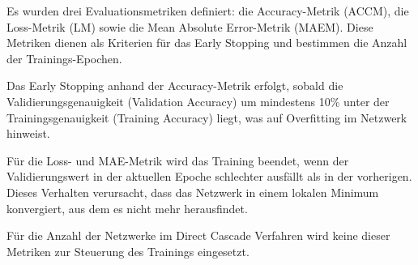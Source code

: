 Es wurden drei Evaluationsmetriken definiert: die Accuracy-Metrik (ACCM), die Loss-Metrik (LM) sowie die Mean Absolute Error-Metrik (MAEM). 
Diese Metriken dienen als Kriterien für das Early Stopping und bestimmen die Anzahl der Trainings-Epochen.

Das Early Stopping anhand der Accuracy-Metrik erfolgt, sobald die Validierungsgenauigkeit (Validation Accuracy) um mindestens 10\% unter der 
Trainingsgenauigkeit (Training Accuracy) liegt, was auf Overfitting im Netzwerk hinweist.

Für die Loss- und MAE-Metrik wird das Training beendet, wenn der Validierungswert in der aktuellen Epoche schlechter ausfällt als in der 
vorherigen. Dieses Verhalten verursacht, dass das Netzwerk in einem lokalen Minimum konvergiert, aus dem es nicht mehr herausfindet.

Für die Anzahl der Netzwerke im Direct Cascade Verfahren wird keine dieser Metriken zur Steuerung des Trainings eingesetzt.
